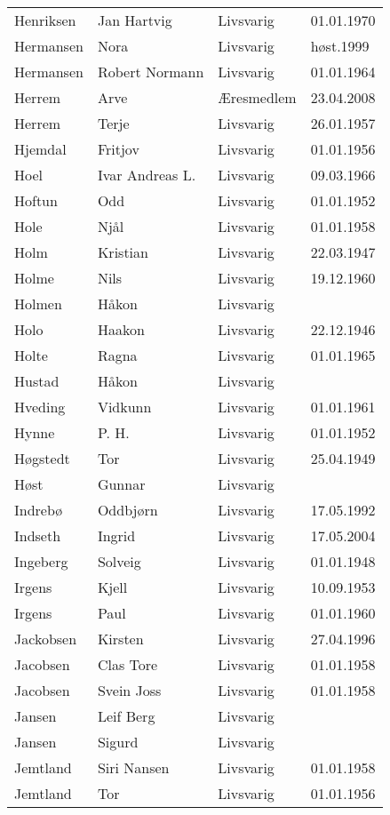 \begin{longtable}{llll}
Henriksen	&	Jan Hartvig	&	Livsvarig 	&	01.01.1970	\\
Hermansen	&	Nora	&	Livsvarig	&	høst.1999	\\
Hermansen	&	Robert Normann	&	Livsvarig 	&	01.01.1964	\\
Herrem	&	Arve	&	Æresmedlem	&	23.04.2008	\\
Herrem	&	Terje	&	Livsvarig 	&	26.01.1957	\\
Hjemdal	&	Fritjov	&	Livsvarig 	&	01.01.1956	\\
Hoel	&	Ivar Andreas L.	&	Livsvarig 	&	09.03.1966	\\
Hoftun	&	Odd	&	Livsvarig 	&	01.01.1952	\\
Hole	&	Njål	&	Livsvarig 	&	01.01.1958	\\
Holm	&	Kristian	&	Livsvarig 	&	22.03.1947	\\
Holme	&	Nils	&	Livsvarig 	&	19.12.1960	\\
Holmen	&	Håkon	&	Livsvarig 	&		\\
Holo	&	Haakon	&	Livsvarig 	&	22.12.1946	\\
Holte	&	Ragna	&	Livsvarig 	&	01.01.1965	\\
Hustad	&	Håkon	&	Livsvarig 	&		\\
Hveding	&	Vidkunn	&	Livsvarig 	&	01.01.1961	\\
Hynne	&	P. H. 	&	Livsvarig 	&	01.01.1952	\\
Høgstedt	&	Tor	&	Livsvarig 	&	25.04.1949	\\
Høst	&	Gunnar	&	Livsvarig 	&		\\
Indrebø	&	Oddbjørn	&	Livsvarig 	&	17.05.1992	\\
Indseth 	&	Ingrid	&	Livsvarig	&	17.05.2004	\\
Ingeberg	&	Solveig	&	Livsvarig 	&	01.01.1948	\\
Irgens	&	Kjell	&	Livsvarig 	&	10.09.1953	\\
Irgens	&	Paul	&	Livsvarig 	&	01.01.1960	\\
Jackobsen 	&	Kirsten	&	Livsvarig	&	27.04.1996	\\
Jacobsen	&	Clas Tore	&	Livsvarig 	&	01.01.1958	\\
Jacobsen	&	Svein Joss	&	Livsvarig 	&	01.01.1958	\\
Jansen	&	Leif Berg	&	Livsvarig 	&		\\
Jansen	&	Sigurd	&	Livsvarig 	&		\\
Jemtland	&	Siri Nansen	&	Livsvarig 	&	01.01.1958	\\
Jemtland	&	Tor	&	Livsvarig 	&	01.01.1956	\\

\end{longtable}
